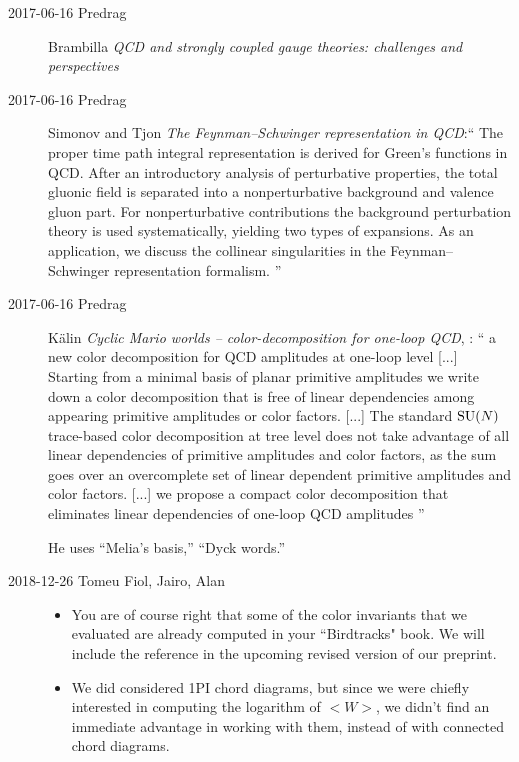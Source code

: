 \begin{description}
\item[2017-06-16 Predrag]
Brambilla \etal{}
{\em {QCD} and strongly coupled gauge theories: challenges and perspectives}

\item[2017-06-16 Predrag]
Simonov and Tjon
{\em The {Feynman–Schwinger} representation in {QCD}}:``
The proper time path integral representation is derived for Green's
functions in QCD. After an introductory analysis of perturbative
properties, the total gluonic field is separated into a nonperturbative
background and valence gluon part. For nonperturbative contributions the
background perturbation theory is used systematically, yielding two types
of expansions. As an application, we discuss the collinear singularities
in the Feynman–Schwinger representation formalism.
''

\item[2017-06-16 Predrag]
K{\"a}lin
{\em Cyclic {Mario} worlds -- color-decomposition for one-loop {QCD}},
: ``
a new color decomposition for QCD amplitudes at one-loop level [...] Starting
from a minimal basis of planar primitive amplitudes we write down a color
decomposition that is free of linear dependencies among appearing primitive
amplitudes or color factors. [...] The  standard  $\textrm{SU}(N)$ trace-based  color
decomposition at  tree  level  does  not take advantage of all linear
dependencies of primitive amplitudes and color factors, as the sum  goes  over
an  overcomplete  set  of  linear  dependent  primitive  amplitudes  and  color
factors. [...] we  propose  a  compact  color  decomposition that eliminates
linear dependencies of one-loop QCD amplitudes
''

He uses ``Melia's basis,'' ``Dyck words.''

\item[2018-12-26 Tomeu Fiol, Jairo, Alan] %
\begin{itemize}
  \item
You are of course right that some of the color invariants that we
evaluated are already computed in your ``Birdtracks" book. We will include
the reference in the upcoming revised version of our preprint.

  \item
We did considered 1PI chord diagrams, but since we were chiefly
interested in computing the logarithm of $<W>$, we didn't find an immediate
advantage in working with them, instead of with connected chord diagrams.


\end{itemize}
\end{description}
